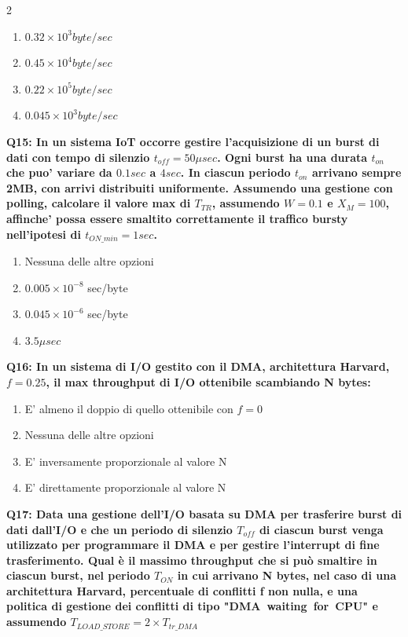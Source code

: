 \documentclass[10pt]{article}
\begin{document}
\begin{multicols}{2}
\begin{enumerate}[label=\arabic*.]
\item $0.32\times10^3 byte/sec$
\item $0.45\times10^4 byte/sec$
\item $0.22\times10^5 byte/sec$
\item $0.045\times10^3 byte/sec$
\end{enumerate}
\textbf{Q15: In un sistema IoT occorre gestire l'acquisizione di un burst di dati con tempo di silenzio $t_{off}=50 \mu sec$. Ogni burst ha una durata $t_{on}$ che puo' variare da $0.1 sec$ a $4 sec$. In ciascun periodo $t_{on}$ arrivano sempre 2MB, con arrivi distribuiti uniformente. Assumendo una gestione con polling, calcolare il valore max di $T_{TR}$, assumendo $W=0.1$ e $X_M = 100$, affinche' possa essere smaltito correttamente il traffico bursty nell'ipotesi di $t_{ON\_min}=1 sec$.}

\begin{enumerate}[label=\arabic*.]
\item Nessuna delle altre opzioni
\item $0.005\times10^{-8}$ sec/byte
\item $0.045\times10^{-6}$ sec/byte
\item $3.5 \mu sec$
\end{enumerate}
\textbf{Q16: In un sistema di I/O gestito con il DMA, architettura Harvard, $f=0.25$, il max throughput di I/O ottenibile scambiando N bytes:}

\begin{enumerate}[label=\arabic*.]
\item E' almeno il doppio di quello ottenibile con $f=0$
\item Nessuna delle altre opzioni
\item E' inversamente proporzionale al valore N
\item E' direttamente proporzionale al valore N
\end{enumerate}
\textbf{Q17: Data una gestione dell’I/O basata su DMA per trasferire burst di dati dall’I/O e che un periodo di silenzio $T_{off}$ di ciascun burst venga utilizzato per programmare il DMA e per gestire l’interrupt di fine trasferimento. Qual è il massimo throughput che si può smaltire in ciascun burst, nel periodo $T_{ON}$ in cui arrivano N bytes, nel caso di una architettura Harvard, percentuale di conflitti f non nulla, e una politica di gestione dei conflitti di tipo "DMA waiting for CPU" e assumendo $T_{LOAD\_STORE} = 2 \times T_{tr\_DMA}$}


\end{multicols}
\end{document}
